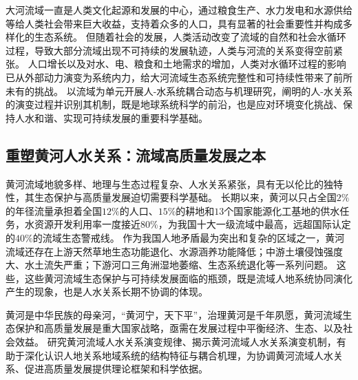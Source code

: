 大河流域一直是人类文化起源和发展的中心，通过粮食生产、水力发电和水源供给等给人类社会带来巨大收益，支持着众多的人口，具有显著的社会重要性并构成多样化的生态系统\cite{best2019}。
但随着社会的发展，人类活动改变了流域的自然和社会水循环过程，导致大部分流域出现不可持续的发展轨迹，人类与河流的关系变得空前紧张\cite{best2019, best2020}。
人口增长以及对水、电、粮食和土地需求的增加\cite{crutzen2006}，人类对水循环过程的影响已从外部动力演变为系统内力，给大河流域生态系统完整性和可持续性带来了前所未有的挑战\cite{dibaldassarre2019}。
以流域为单元开展人-水系统耦合动态与机理研究，阐明的人-水关系的演变过程并识别其机制，既是地球系统科学的前沿，也是应对环境变化挑战、保持人水和谐、实现可持续发展的重要科学基础。

\subsection{重塑黄河人水关系：流域高质量发展之本}

黄河流域地貌多样、地理与生态过程复杂、人水关系紧张，具有无以伦比的独特性，其生态保护与高质量发展迫切需要科学基础。
长期以来，黄河以只占全国$2\%$的年径流量承担着全国$12\%$的人口、$15\%$的耕地和$13$个国家能源化工基地的供水任务，水资源开发利用率一度接近$80\%$，为我国十大一级流域中最高，远超国际认定的$40\%$的流域生态警戒线\cite{fu2021a}。
作为我国人地矛盾最为突出和复杂的区域之一，黄河流域还存在上游天然草地生态功能退化、水源涵养功能降低；中游土壤侵蚀强度大、水土流失严重；下游河口三角洲湿地萎缩、生态系统退化等一系列问题\cite{mazhuguo2020}。
这些，这些黄河流域生态保护与可持续发展面临的瓶颈，既是流域人地系统协同演化产生的现象，也是人水关系长期不协调的体现\cite{fu2021a}。

黄河是中华民族的母亲河，“黄河宁，天下平”，治理黄河是千年夙愿，黄河流域生态保护和高质量发展是重大国家战略，亟需在发展过程中平衡经济、生态、以及社会效益。
研究黄河流域人水关系演变规律、揭示黄河流域人水关系演变机制，有助于深化认识人地关系地域系统的结构特征与耦合机理，为协调黄河流域人水关系、促进高质量发展提供理论框架和科学依据。
